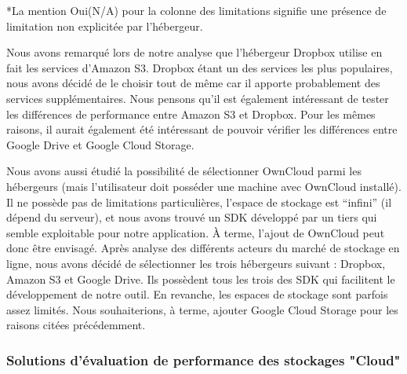\documentclass[10pt]{article}
\begin{document}
*La mention Oui(N/A) pour la colonne des limitations signifie une
présence de limitation non explicitée par l'hébergeur.

Nous avons remarqué lors de notre analyse que l’hébergeur Dropbox
utilise en fait les services d'Amazon S3. Dropbox étant un des
services les plus populaires, nous avons décidé de le choisir tout de
même car il apporte probablement des services supplémentaires. Nous
pensons qu’il est également intéressant de tester les différences de
performance entre Amazon S3 et Dropbox. Pour les mêmes raisons, il aurait
également été intéressant de pouvoir vérifier les différences entre
Google Drive et Google Cloud Storage.

Nous avons aussi étudié la possibilité de sélectionner OwnCloud parmi
les hébergeurs (mais l’utilisateur doit posséder une machine avec
OwnCloud installé). Il ne possède pas de limitations particulières,
l’espace de stockage est “infini” (il dépend du serveur), et nous
avons trouvé un SDK développé par un tiers qui semble exploitable pour
notre application. À terme, l’ajout de OwnCloud peut donc être
envisagé. Après analyse des différents acteurs du marché de stockage
en ligne, nous avons décidé de sélectionner les trois hébergeurs
suivant : Dropbox, Amazon S3 et Google Drive. Ils possèdent tous les
trois des SDK qui facilitent le développement de notre outil. En
revanche, les espaces de stockage sont parfois assez limités. Nous
souhaiterions, à terme, ajouter Google Cloud Storage pour les raisons
citées précédemment.

\subsubsection{Solutions d'évaluation de performance des stockages "Cloud"}
\end{document}
